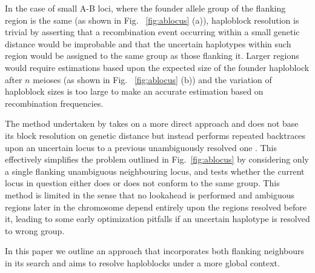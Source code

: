 In the case of small A-B loci, where the founder allele group of the flanking region is the same (as shown in Fig. ~\ref{fig:ablocus} (a)), haploblock resolution is trivial by asserting that a recombination event occurring within a small genetic distance would be improbable and that the uncertain haplotypes within such region would be assigned to the same group as those flanking it. Larger regions would require estimations based upon the expected size of the founder haploblock after $n$ meioses (as shown in Fig. ~\ref{fig:ablocus} (b)) and the variation of haploblock sizes is too large to make an accurate estimation based on recombination frequencies.

The method undertaken by \hpainter takes on a more direct approach and does not base its block resolution on genetic distance but instead performs repeated backtraces upon an uncertain locus to a previous unambiguously resolved one \citep{hpaint,hpaintmanual}. This effectively simplifies the problem outlined in Fig.~\ref{fig:ablocus} by considering only a single flanking unambiguous neighbouring locus, and tests whether the current locus in question either does or does not conform to the same group. This method is limited in the sense that no lookahead is performed and ambiguous regions later in the chromosome depend entirely upon the regions resolved before it, leading to some early optimization pitfalls if an uncertain haplotype is resolved to wrong group.


In this paper we outline an approach that incorporates both flanking neighbours in its search and aims to resolve haploblocks under a more global context.